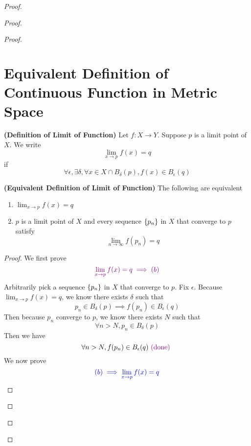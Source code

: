 \documentclass{report}
\begin{document}
\begin{proof}
\begin{proof}
\begin{proof}
\section{Equivalent Definition of Continuous Function in Metric Space}
\begin{definition}
\label{5.1.1}
\textbf{(Definition of Limit of Function)} Let $f:X\rightarrow Y$. Suppose $p$ is a limit point of $X$. We write 
\begin{equation*}
\lim_{x\to p}f(x)=q
\end{equation*}
if
\begin{equation*}
\forall \epsilon , \exists \delta, \forall x \in X\cap B_\delta(p), f(x)\in B_{\epsilon }(q)
\end{equation*}
\end{definition}
\begin{theorem}
\label{5.1.2}
\textbf{(Equivalent Definition of Limit of Function)} The following are equivalent
\begin{enumerate}[label=(\alph*)]
  \item $\lim_{x\to p}f(x)=q$
  \item $p$ is a limit point of  $X$ and every sequence $\{ p_n \}$ in $X$  that converge to $p$  satisfy 
    \begin{equation*}
    \lim_{n\to\infty}f(p_n)=q
    \end{equation*}
\end{enumerate}
\end{theorem}
\begin{proof}
We first prove 
\begin{equation*}
\textcolor{violet}{\lim_{x\to p}f(x)=q\implies (b)}
\end{equation*}
Arbitrarily pick a sequence $\{ p_n \}$ in $X$ that converge to $p$. Fix $\epsilon $. Because $\lim_{x\to p}f(x)=q$, we know there exists $\delta$ such that 
\begin{equation*}
p_n \in B_{\delta}(p)\implies f(p_n)\in B_\epsilon (q)
\end{equation*}
Then because $p_n$ converge to $p$, we know there exists  $N$ such that 
\begin{equation*}
\forall n>N, p_n\in B_{\delta }(p)
\end{equation*}
Then we have 
\begin{equation*}
\forall n>N,f(p_n)\in B_\epsilon (q)\textcolor{violet}{\text{ (done) }}
\end{equation*}
We now prove 
\begin{equation*}
\textcolor{blue}{(b)\implies \lim_{x\to p}f(x)=q}
\end{equation*}

\end{proof}
\end{proof}
\end{proof}
\end{proof}
\end{document}
